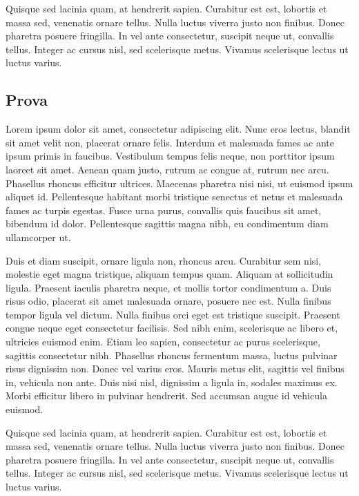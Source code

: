 \documentclass[11pt,a4paper]{article}
\begin{document}
Quisque sed lacinia quam, at hendrerit sapien. Curabitur est est, lobortis et massa sed, venenatis ornare tellus. Nulla luctus viverra justo non finibus. Donec pharetra posuere fringilla. In vel ante consectetur, suscipit neque ut, convallis tellus. Integer ac cursus nisl, sed scelerisque metus. Vivamus scelerisque lectus ut luctus varius.

\subsection{Prova}
Lorem ipsum dolor sit amet, consectetur adipiscing elit. Nunc eros lectus, blandit sit amet velit non, placerat ornare felis. Interdum et malesuada fames ac ante ipsum primis in faucibus. Vestibulum tempus felis neque, non porttitor ipsum laoreet sit amet. Aenean quam justo, rutrum ac congue at, rutrum nec arcu. Phasellus rhoncus efficitur ultrices. Maecenas pharetra nisi nisi, ut euismod ipsum aliquet id. Pellentesque habitant morbi tristique senectus et netus et malesuada fames ac turpis egestas. Fusce urna purus, convallis quis faucibus sit amet, bibendum id dolor. Pellentesque sagittis magna nibh, eu condimentum diam ullamcorper ut.

Duis et diam suscipit, ornare ligula non, rhoncus arcu. Curabitur sem nisi, molestie eget magna tristique, aliquam tempus quam. Aliquam at sollicitudin ligula. Praesent iaculis pharetra neque, et mollis tortor condimentum a. Duis risus odio, placerat sit amet malesuada ornare, posuere nec est. Nulla finibus tempor ligula vel dictum. Nulla finibus orci eget est tristique suscipit. Praesent congue neque eget consectetur facilisis. Sed nibh enim, scelerisque ac libero et, ultricies euismod enim. Etiam leo sapien, consectetur ac purus scelerisque, sagittis consectetur nibh. Phasellus rhoncus fermentum massa, luctus pulvinar risus dignissim non. Donec vel varius eros. Mauris metus elit, sagittis vel finibus in, vehicula non ante. Duis nisi nisl, dignissim a ligula in, sodales maximus ex. Morbi efficitur libero in pulvinar hendrerit. Sed accumsan augue id vehicula euismod.

Quisque sed lacinia quam, at hendrerit sapien. Curabitur est est, lobortis et massa sed, venenatis ornare tellus. Nulla luctus viverra justo non finibus. Donec pharetra posuere fringilla. In vel ante consectetur, suscipit neque ut, convallis tellus. Integer ac cursus nisl, sed scelerisque metus. Vivamus scelerisque lectus ut luctus varius.
\end{document}
